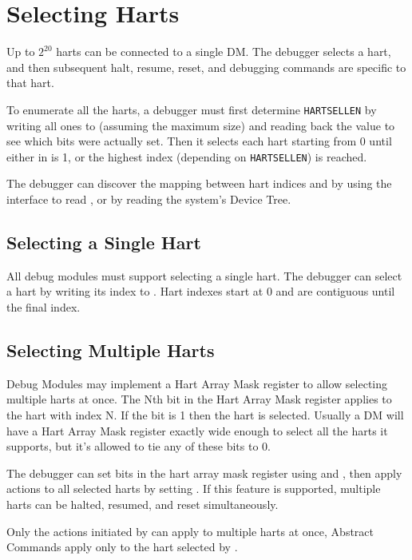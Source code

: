 \section{Selecting Harts} \label{selectingharts}

Up to $2^{20}$ harts can be connected to a single DM. The debugger
selects a hart, and then subsequent halt, resume, reset, and debugging
commands are specific to that hart.

To enumerate all the harts, a debugger must first determine {\tt HARTSELLEN}
by writing  all ones to \Fhartsel (assuming the maximum size) and reading back
the value to see which bits were actually set.  Then it selects each hart
starting from 0 until either \Fanynonexistent in \Rdmstatus is 1, or the
highest index (depending on {\tt HARTSELLEN}) is reached.

The debugger can discover the mapping between hart indices and
\Rmhartid by using the interface to read \Rmhartid, or by
reading the system's Device Tree.

\subsection {Selecting a Single Hart}

All debug modules must support selecting a single hart.
The debugger can select a hart by writing its index to \Fhartsel.
Hart indexes start at 0 and are contiguous until the final index.

\subsection {Selecting Multiple Harts} \label{hartarraymask}

Debug Modules may implement a Hart Array Mask register to allow selecting
multiple harts at once. The Nth bit in the Hart Array Mask register applies to
the hart with index N. If the bit is 1 then the hart is selected.  Usually a DM
will have a Hart Array Mask register exactly wide enough to select all the
harts it supports, but it's allowed to tie any of these bits to 0.

The debugger can set bits in the hart array mask register using \Rhawindowsel
and \Rhawindow, then apply actions to all selected harts by setting \Fhasel. If
this feature is supported, multiple harts can be halted, resumed, and reset
simultaneously.

Only the actions initiated by \Rdmcontrol can apply to multiple harts
at once, Abstract Commands apply only to the hart selected by
\Fhartsel.

